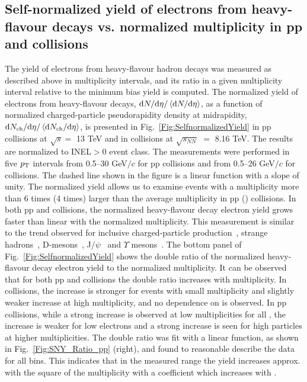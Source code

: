 \subsection[Self-normalized yield of electrons from heavy-flavour decays vs. normalized multiplicity]{Self-normalized yield of electrons from heavy-flavour decays vs. normalized multiplicity in pp and \pPb collisions}
The yield of electrons from heavy-flavour hadron decays was measured as described above in multiplicity intervals, and its ratio in a given multiplicity interval relative to the minimum bias yield is computed. The normalized yield of electrons from heavy-flavour decays, ${\rm d}N/{\rm d}\eta/\left<{\rm d}N/{\rm d}\eta\right>$, as a function of normalized charged-particle pseudorapidity density at midrapidity, ${\rm d}N_{\rm ch}/{\rm d}\eta/\left<{\rm d}N_{\rm ch}/{\rm d}\eta\right>$, is presented in Fig.~\ref{Fig:SelfnormalizedYield} in pp collisions at $\sqrt{s} =$ 13 TeV and in \pPb collisions at $\sqrt{s_{NN}}$ $=$ 8.16 TeV.  The results are normalized to INEL$>0$ event class. The measurements were performed in five $p_{\rm T}$ intervals from 0.5--30 GeV$/c$ for pp collisions and from 0.5--26 GeV$/c$ for \pPb collisions. The dashed line shown in the figure is a linear function with a slope of unity. The normalized yield allows us to examine events with a multiplicity more than 6 times (4 times) larger than the average multiplicity in pp (\pPb) collisions. In both pp and \pPb collisions, the normalized heavy-flavour decay electron yield grows faster than linear with the normalized multiplicity. This measurement is similar to the trend observed for inclusive charged-particle production~\cite{Acharya:2019mzb}, strange hadrons~\cite{Acharya:2019kyh}, D-mesons~\cite{Adam:2015ota,Adam:2016mkz},  J/$\psi$~\cite{Acharya:2020pit,Abelev:2012rz,Acharya:2020giw} and $\Upsilon$ mesons~\cite{Chatrchyan:2013nza}.
The bottom panel of Fig.~\ref{Fig:SelfnormalizedYield} shows the double ratio of the normalized heavy-flavour decay electron yield to the normalized multiplicity. It can be observed that for both pp and \pPb collisions the double ratio increases with multiplicity. In \pPb collisions, the increase is stronger for events with small multiplicity and slightly weaker increase at high multiplicity, and no dependence on \pt is observed. In pp collisions, while a strong increase is observed at low multiplicities for all \pt, the increase is weaker for low \pt electrons and a strong increase is seen for high \pt particles at higher multiplicities. The double ratio was fit with a linear function, as shown in Fig.~\ref{Fig:SNY_Ratio_pp} (right), and found to reasonable describe the data for all \pt bins. This indicates that in the measured \pt range the yield increases approx. with the square of the multiplicity with a coefficient which increases with \pt.

